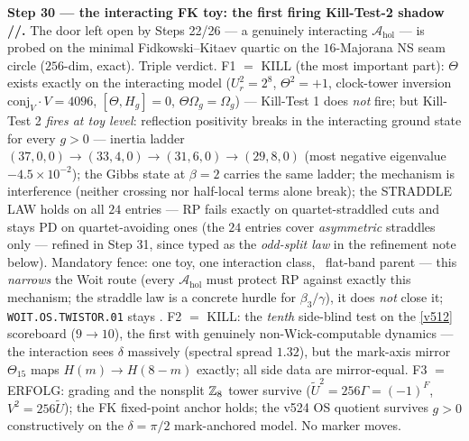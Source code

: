 \par\smallskip\noindent\textbf{Step 30 --- the interacting FK toy: the first firing
Kill-Test-2 shadow \mE/\mC/\mO.} The door left open by Steps 22/26 --- a genuinely
interacting $\mathcal A_{\mathrm{hol}}$ --- is probed on the minimal Fidkowski--Kitaev
quartic on the $16$-Majorana NS seam circle ($256$-dim, exact). Triple verdict. F1 $=$
KILL (the most important part): $\Theta$ exists exactly on the interacting model
($U_r^2=2^8$, $\Theta^2=+1$, clock-tower inversion $\mathrm{conj}_V\cdot V=4096$,
$[\Theta,H_g]=0$, $\Theta\Omega_g=\Omega_g$) --- Kill-Test 1 does \emph{not} fire; but
Kill-Test 2 \emph{fires at toy level}: reflection positivity breaks in the interacting
ground state for every $g>0$ --- inertia ladder $(37,0,0)\to(33,4,0)\to(31,6,0)\to
(29,8,0)$ (most negative eigenvalue $-4.5\times10^{-2}$); the Gibbs state at $\beta=2$
carries the same ladder; the mechanism is interference (neither crossing nor half-local
terms alone break); the STRADDLE LAW holds on all $24$ entries --- RP fails exactly on
quartet-straddled cuts and stays PD on quartet-avoiding ones (the $24$ entries cover
\emph{asymmetric} straddles only --- refined in Step 31, since typed as the \emph{odd-split
law} in the refinement note below). Mandatory fence: one toy,
one interaction class, \mC\ flat-band parent --- this \emph{narrows} the Woit route
(every $\mathcal A_{\mathrm{hol}}$ must protect RP against exactly this mechanism; the
straddle law is a concrete hurdle for $\beta_3/\gamma$), it does \emph{not} close it;
\texttt{WOIT.OS.TWISTOR.01} stays \mO. F2 $=$ KILL: the \emph{tenth} side-blind test on
the \vref{v512} scoreboard ($9\to10$), the first with genuinely non-Wick-computable
dynamics --- the interaction sees $\delta$ massively (spectral spread $1.32$), but the
mark-axis mirror $\Theta_{15}$ maps $H(m)\to H(8-m)$ exactly; all side data are
mirror-equal. F3 $=$ ERFOLG: grading and the nonsplit $\mathbb{Z}_8$ tower survive
($\tilde U^2=256\Gamma=(-1)^F$, $V^2=256\tilde U$); the FK fixed-point anchor holds; the
v524 OS quotient survives $g>0$ constructively on the $\delta=\pi/2$ mark-anchored model.
No marker moves.

